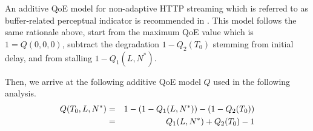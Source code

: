 An additive \gls{QoE} model for non-adaptive HTTP streaming which is referred to as buffer-related perceptual indicator is recommended in \cite{ITUT2012}. This model follows the same rationale above, start from the maximum QoE value which is \(1=Q(0,0,0)\), subtract the degradation \(1-Q_2(T_0)\) stemming from initial delay, and from stalling \(1-Q_1(L,N^*)\).

Then, we arrive at the following additive QoE model \(Q\) used in the following analysis.  
\begin{eqnarray}
  Q(T_0,L,N^*) &=& 1-(1-Q_1(L,N^*)) - (1-Q_2(T_0)) \notag\\
   &=& Q_1(L,N^*) + Q_2(T_0) - 1
\label{eq:application:qoe_user_behaviour:typical_user_scenarios:youtube_qoe:combined:qsum}
\end{eqnarray}
